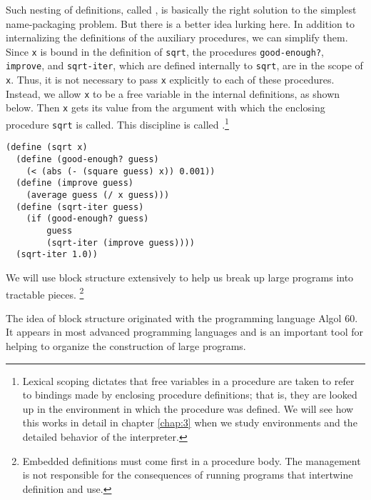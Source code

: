Such nesting of definitions, called ,
is basically the right solution to the simplest 
name-packaging problem.  But there is a better idea lurking here.  In
addition to internalizing the definitions of the auxiliary procedures,
we can simplify them.  Since \texttt{x} is bound in the definition of
\texttt{sqrt}, the procedures \texttt{good-enough?}, \texttt{improve}, and
\texttt{sqrt-iter}, which are defined internally to \texttt{sqrt}, are in the
scope of \texttt{x}.  Thus, it is not necessary to pass \texttt{x} explicitly to
each of these procedures.  Instead, we allow \texttt{x} to be a free
variable in the internal definitions, as shown below. Then \texttt{x}
gets its value from the argument with which the enclosing
procedure \texttt{sqrt} is called.  This discipline is called .\footnote{Lexical
scoping dictates that free variables in a procedure are taken to refer to
bindings made by enclosing procedure definitions;
that is, they are looked up in
the environment in which the procedure was defined.  We will see how
this works in detail in chapter \ref{chap:3} when we study environments and the
detailed behavior of the interpreter.}

\begin{verbatim}
(define (sqrt x)
  (define (good-enough? guess)
    (< (abs (- (square guess) x)) 0.001))
  (define (improve guess)
    (average guess (/ x guess)))
  (define (sqrt-iter guess)
    (if (good-enough? guess)
        guess
        (sqrt-iter (improve guess))))
  (sqrt-iter 1.0))
\end{verbatim}

We will use block structure extensively to help us break up large
programs into tractable pieces. \footnote{Embedded definitions must
  come first in a procedure body.  The management is not responsible
  for the consequences of running programs that intertwine definition
  and use.}

The idea of block structure originated with the programming language
Algol 60.  It appears in most advanced programming languages and is an
important tool for helping to organize the construction of large
programs.


